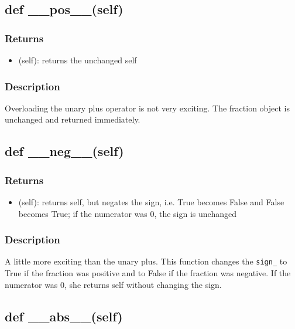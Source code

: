 \documentclass[refman]{scrartcl}
\begin{document}
\subsection{def \_\_pos\_\_(self)}

\subsubsection*{Returns}

\begin{itemize}
  \item (self): returns the unchanged self
\end{itemize}

\subsubsection*{Description}

Overloading the unary plus operator is not very exciting. The fraction object is unchanged and returned immediately.

\subsection{def \_\_neg\_\_(self)}

\subsubsection*{Returns}

\begin{itemize}
	\item (self): returns self, but negates the sign, i.e. True becomes False and False becomes True; if the numerator was 0, the sign is unchanged
  \end{itemize}

\subsubsection*{Description}

A little more exciting than the unary plus. This function changes the \texttt{sign\_} to True if the fraction was positive and to False if the fraction was negative. If the numerator was 0, she returns self without changing the sign.

\subsection{def \_\_abs\_\_(self)}
\end{document}
